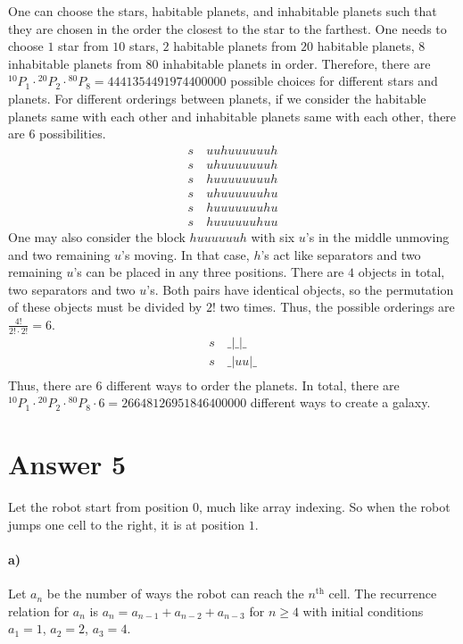 \documentclass[12pt]{article}
\newcommand{\+}{\mkern2mu}
\newcommand*{\myPerm}[2]{{}^{#1}\!P_{#2}}%
\begin{document}
One can choose the stars, habitable planets, and inhabitable planets such that they are chosen in the order the closest to the star to the farthest. One needs to choose $1$ star from $10$ stars, $2$ habitable planets from $20$ habitable planets, $8$ inhabitable planets from $80$ inhabitable planets in order. Therefore, there are $\myPerm{10}{1} \cdot \myPerm{20}{2} \cdot \myPerm{80}{8} = \num[group-separator={,}]{4441354491974400000}$ possible choices for different stars and planets. For different orderings between planets, if we consider the habitable planets same with each other and inhabitable planets same with each other, there are $6$ possibilities.
\begin{gather*}
    s \quad uuhuuuuuuh \\
    s \quad uhuuuuuuuh \\
    s \quad huuuuuuuuh \\
    s \quad uhuuuuuuhu \\
    s \quad huuuuuuuhu \\
    s \quad huuuuuuhuu
\end{gather*}
One may also consider the block $huuuuuuh$ with six $u$'s in the middle unmoving and two remaining $u$'s moving. In that case, $h$'s act like separators and two remaining $u$'s can be placed in any three positions. There are $4$ objects in total, two separators and two $u$'s. Both pairs have identical objects, so the permutation of these objects must be divided by $2!$ two times. Thus, the possible orderings are $\tfrac{4!}{2! \cdot 2!} = 6$.
\begin{gather*}
    s \quad \_|\_|\_ \\
    s \quad \_|uu|\_ \\
\end{gather*}
Thus, there are $6$ different ways to order the planets. In total, there are $\myPerm{10}{1} \cdot \myPerm{20}{2} \cdot \myPerm{80}{8} \cdot 6 = \num[group-separator={,}]{26648126951846400000}$ different ways to create a galaxy.

\section*{Answer 5}

Let the robot start from position $0$, much like array indexing. So when the robot jumps one cell to the right, it is at position $1$.
\paragraph{a)}
Let $a_n$ be the number of ways the robot can reach the $n^\text{th}$ cell. The recurrence relation for $a_n$ is $a_n = a_{n-1} + a_{n-2} + a_{n-3}$ for $n \geq 4$ with initial conditions $a_1 = 1$, $a_2 = 2$, $a_3 = 4$.
\end{document}
